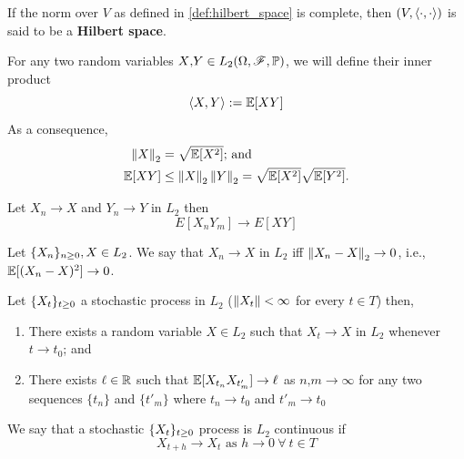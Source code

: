 \documentclass[../TGMAFFIRO]{subfiles}
\begin{document}
\begin{remark}
	If the norm over $V$ as defined in \ref{def:hilbert_space} is complete, then $(V, \langle \cdot, \cdot\rangle)$ is said to be a \textbf{Hilbert space}.
\end{remark}

For any two random variables $X\text{,}Y\in L_2(\Omega, \mathscr{F}, \mathbb{P})$, we will define their inner product
\begin{equation}
	\langle X, Y\rangle := \mathbb{E}[XY]
\end{equation}
As a consequence,
\begin{align}
	\left\lVert X\right\rVert_2 &= \sqrt{\mathbb{E}[X^2]}\text{; and} \\
	\mathbb{E}[XY] &\leq \left\lVert X\right\rVert_2 \left\lVert Y\right\rVert_2 = \sqrt{\mathbb{E}[X^2]} \sqrt{\mathbb{E}[Y^2]}.
\end{align}

\begin{proposition}\label{prop:convergence_expectation}
Let $X_n\to X$ and $Y_n\to Y$ in $L_2$ then
\begin{equation}
  E[X_nY_m] \to E[XY]
\end{equation}

\end{proposition}

\begin{definition}
	Let $\{X_n\}_{n\geq 0}, X \in L_2$. We say that $X_n\to X$ in $L_2$ iff $\left\lVert X_n - X\right\rVert_2\to 0$, i.e., $\mathbb{E}[(X_n - X)^2] \to 0$.
\end{definition}

\begin{proposition}
	Let $\{X_t\}_{t\geq 0}$ a stochastic process in $L_2$ ($\left\lVert X_t\right\rVert < \infty$ for every $t\in T$) then,
	\begin{enumerate}
		\item There exists a random variable $X\in L_2$ such that $X_t \to X$ in $L_2$ whenever $t\to t_0$; and
		\item There exists $\ell \in \mathbb{R}$ such that $\mathbb{E}[X_{t_n}X_{t'_m}] \to \ell$ as $n\text{,}m \to \infty$ for any two sequences $\{t_n\}$ and $\{t'_m\}$ where $t_n \to t_0$ and $t'_m \to t_0$
	\end{enumerate}
\end{proposition}


\begin{definition}
We say that a stochastic $\{X_t\}_{t\geq 0}$ process is $L_2$ continuous if
	\begin{equation}
	  X_{t+h} \to X_t \text{ as } h\to 0 \ \forall \ t\in T 
	\end{equation}
\end{definition}
\end{document}
